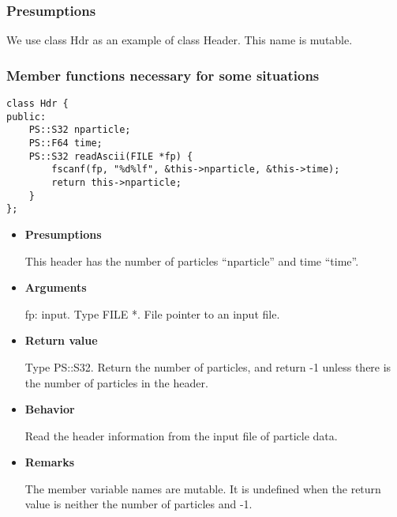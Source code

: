 \subsubsection{Presumptions}

We use class Hdr as an example of class Header. This name is mutable.

\subsubsection{Member functions necessary for some situations}


\begin{screen}
\begin{verbatim}
class Hdr {
public:
    PS::S32 nparticle;
    PS::F64 time;
    PS::S32 readAscii(FILE *fp) {
        fscanf(fp, "%d%lf", &this->nparticle, &this->time);
        return this->nparticle;
    }
};
\end{verbatim}
\end{screen}

\begin{itemize}

\item {\bf Presumptions}

  This header has the number of particles ``nparticle'' and time
  ``time''.

\item {\bf Arguments}

  fp: input. Type FILE *. File pointer to an input file.
  
\item {\bf Return value}

  Type PS::S32. Return the number of particles, and return -1 unless
  there is the number of particles in the header.
  
\item {\bf Behavior}

  Read the header information from the input file of particle data.
  
\item {\bf Remarks}

  The member variable names are mutable. It is undefined when the
  return value is neither the number of particles and -1.
  
\end{itemize}

